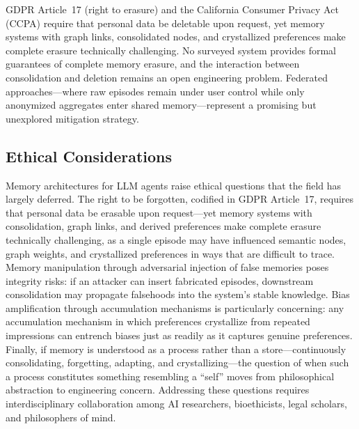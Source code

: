GDPR Article~17 (right to erasure) and the California Consumer Privacy
Act (CCPA) require that personal data be deletable upon request, yet
memory systems with graph links, consolidated nodes, and crystallized
preferences make complete erasure technically challenging.  No surveyed
system provides formal guarantees of complete memory erasure, and the
interaction between consolidation and deletion remains an open
engineering problem.  Federated approaches---where raw episodes remain
under user control while only anonymized aggregates enter shared
memory---represent a promising but unexplored mitigation strategy.

\subsection{Ethical Considerations}

Memory architectures for LLM agents raise ethical questions that the
field has largely deferred. The right to be forgotten, codified in
GDPR Article~17, requires that personal data be erasable upon
request---yet memory systems with consolidation, graph links, and
derived preferences make complete erasure technically challenging, as
a single episode may have influenced semantic nodes, graph weights,
and crystallized preferences in ways that are difficult to trace.
Memory manipulation through adversarial injection of false memories
poses integrity risks: if an attacker can insert fabricated episodes,
downstream consolidation may propagate falsehoods into the system's
stable knowledge. Bias amplification through accumulation mechanisms
is particularly concerning: any accumulation mechanism in which
preferences crystallize from repeated impressions can entrench
biases just as readily as it captures genuine preferences. Finally, if memory is
understood as a process rather than a store---continuously
consolidating, forgetting, adapting, and crystallizing---the question
of when such a process constitutes something resembling a ``self''
moves from philosophical abstraction to engineering concern.
Addressing these questions requires interdisciplinary collaboration
among AI researchers, bioethicists, legal scholars, and philosophers
of mind.
